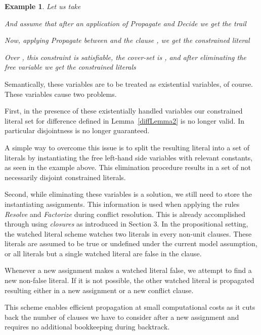 \documentclass[a4paper]{article}
\newtheorem{example}[defi]{Example}
\begin{document}
{\begin{example}\label{freeVarEx}
Let us take

And assume that after an application of \emph{Propagate} and \emph{Decide} we get the trail

Now, applying \emph{Propagate} between  and the clause , we get the constrained literal

Over , this constraint is satisfiable, 
the cover-set is , and after eliminating the free variable  we get the constrained literals

\end{example}

Semantically, these variables are to be treated as existential variables, of course. 
These variables cause two problems. 

First, in the presence of these existentially handled variables 
our constrained literal set for difference defined in Lemma~\ref{diffLemma2} is no longer valid. 
In particular disjointness is no longer guaranteed. 

A simple way to overcome this issue is to split the resulting literal into a set of literals by instantiating 
the free left-hand side variables with relevant constants, as seen in the example above. 
This elimination procedure results in a set of not necessarily disjoint constrained literals.

Second, while eliminating these variables is a solution, we still need to store the instantiating assignments.
This information is used 
when applying the rules \emph{Resolve} and \emph{Factorize} during conflict resolution.
This is already accomplished through using \emph{closures} as introduced in Section 3.
In the propositional setting, the watched literal scheme watches two literals in every non-unit clauses. 
These literals are assumed to be true or undefined under the current model assumption, or all literals but a single watched literal are false in the clause.

Whenever a new assignment makes a watched literal false, 
we attempt to find a new non-false literal. 
If it is not possible, the other watched literal is propagated resulting either in a new assignment or a new conflict clause.

This scheme enables efficient propagation at small computational costs as it cuts back the number of clauses we have to consider
after a new assignment and requires no additional bookkeeping during backtrack.

}
\end{document}
